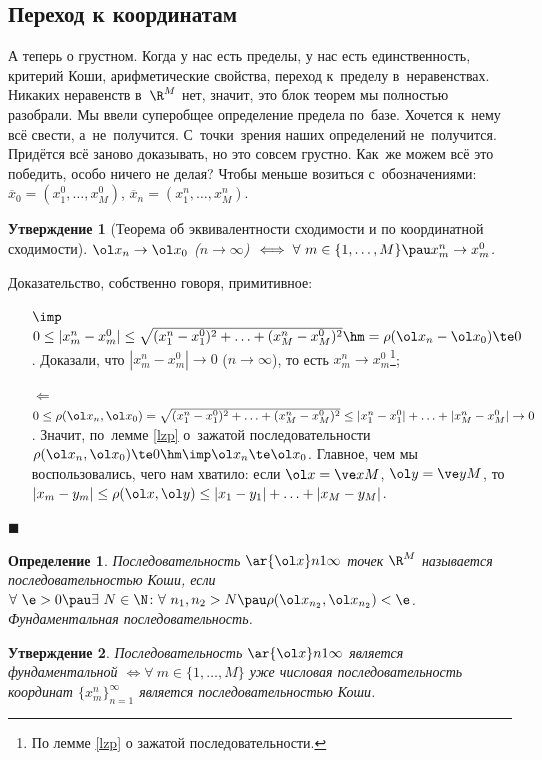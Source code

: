 \documentclass[a4paper,10pt,twoside]{article}
\newtheorem{Def}{Определение}[section]
\newtheorem{Ut}{Утверждение}[section]
\newenvironment{Proof}
       {\par\noindent{\textbf{Доказательство.}}}
       {\hfill$\scriptstyle\blacksquare$}
\begin{document}
	 \subsection{Переход к координатам}
	 А теперь о грустном. Когда у нас есть пределы, у нас есть единственность, критерий Коши, арифметические свойства, переход к~пределу в~неравенствах.
	 Никаких неравенств в~$\R^M$ нет, значит, это блок теорем мы полностью разобрали.
	 Мы ввели суперобщее определение предела по~базе. Хочется к~нему всё свести, а~не~получится. С~точки~зрения наших определений не~получится.
	 Придётся всё заново доказывать, но это совсем грустно. Как~же можем всё это победить, особо ничего не делая?
	 Чтобы меньше возиться с~обозначениями: $\overline x_0 = (x_1^0,\ldots,x_M^0)$, $\overline x_n = (x_1^n, \ldots, x_M^n)$.
	 \begin{Ut}[Теорема об эквивалентности сходимости и по координатной сходимости]
	 $\ol x_n \to \ol x_0$ ($n \to \infty$) $\iff \forall\ m \in \{1, \ldots, M\}\pau x_m^n \to x_m^0$.
	 \end{Ut}
	 \begin{Proof}
	 Доказательство, собственно говоря, примитивное:
	 \begin{itemize}
	   \item [$\imp$] $0 \le |x_m^n-x_m^0| \le \sqrt{(x_1^n-x_1^0)^2+\ldots+(x_M^n-x_M^0)^2}\hm=\rho(\ol x_n - \ol x_0)\te0$.
	   Доказали, что $|x_m^n - x_m^0| \to 0$ ($n\to\infty$), то есть $x_m^n \to x_m^0$\footnote{По лемме \ref{lzp} о зажатой последовательности.};
	   \item [$\Leftarrow$] $0 \le \rho (\ol x_n, \ol x_0) = \sqrt{(x_1^n-x_1^0)^2+\ldots+(x_M^n-x_M^0)^2} \le |x_1^n-x_1^0|+\ldots+|x_M^n-x_M^0| \to 0$.
	   Значит, по~лемме  \ref{lzp} о~зажатой последовательности $\rho(\ol x_n, \ol x_0) \te 0 \hm\imp \ol x_n \te \ol x_0$.
	   Главное, чем мы воспользовались, чего нам хватило: если $\ol x=\ve xM$, $\ol y=\ve yM$, то $|x_m-y_m| \le \rho(\ol x, \ol y) \le |x_1-y_1|+\ldots+|x_M-y_M|$.
	 \end{itemize}
	 \end{Proof}
	 
	 \begin{Def}
	 Последовательность $\ar {\ol x}n1\infty $ точек $\R^M$ называется последовательностью Коши, если $\forall \ \e>0\pau \exists \ N\in\N\colon \forall \ n_1,n_2>N\pau \rho(\ol x_{n_2},\ol x_{n_2})<\e$.
	 Фундаментальная последовательность.
	 \end{Def}
	 \begin{Ut}
	 Последовательность $\ar {\ol x}n1\infty$ является фундаментальной $\iff \forall\ m\in\{1,\ldots,M\}$ уже числовая последовательность
	 координат $\big\{x_m^n\big\}_{n=1}^\infty$ является последовательностью Коши.
	 \end{Ut}
	 
\end{document}
